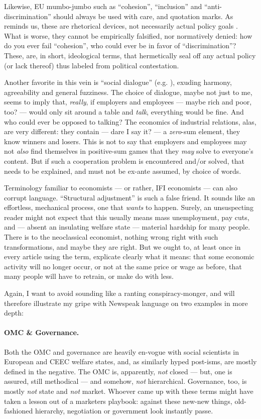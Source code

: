 \documentclass[11pt,a4paper,oneside]{article}
\begin{document}
Likewise, \gls{EU} mumbo-jumbo such as ``cohesion'', ``inclusion'' and ``anti-discrimination'' should always be used with care, and quotation marks.
As \citeauthor{Offe2003} reminds us, these are rhetorical devices, not necessarily actual policy goals \citeyearpar[461]{Offe2003}.
What is worse, they cannot be empirically falsified, nor normatively denied:
how do you ever fail ``cohesion'', who could ever be in favor of ``discrimination''?
These, are, in short, ideological terms, that hermetically seal off any actual policy (or lack thereof) thus labeled from political contestation.

Another favorite in this vein is ``social dialogue'' (e.g. \citealt{Durr2009}), exuding harmony, agreeability and general fuzziness.
The choice of dialogue, maybe not just to me, seems to imply that, \emph{really}, if employers and employees --- maybe rich and poor, too? --- would only sit around a table and \emph{talk}, everything would be fine.
And who could ever be opposed to talking?
The economics of industrial relations, alas, are very different:
they contain --- dare I say it? --- a \emph{zero}-sum element, they know winners and losers.
This is not to say that employers and employees may not \emph{also} find themselves in positive-sum games that they \emph{may} solve to everyone's content.
But if such a cooperation problem is encountered and/or solved, that needs to be explained, and must not be ex-ante assumed, by choice of words.

Terminology familiar to economists --- or rather, \gls{IFI} economists --- can also corrupt language.
``Structural adjustment'' \citep[e.g.][19]{Begg2008} is such a false friend.
It sounds like an effortless, mechanical process, one that \emph{wants} to happen.
Surely, an unsuspecting reader might not expect that this usually means mass unemployment, pay cuts, and --- absent an insulating welfare state --- material hardship for many people.
There is to the neoclassical economist, nothing wrong right with such transformations, and maybe they are right.
But we ought to, at least once in every article using the term, explicate clearly what it means:
that some economic activity will no longer occur, or not at the same price or wage as before, that many people will have to retrain, or make do with less.

Again, I want to avoid sounding like a ranting conspiracy-monger, and will therefore illustrate my gripe with Newspeak language on two examples in more depth:

\paragraph{\gls{OMC} \& Governance.} Both the \gls{OMC} and governance are heavily en-vogue with social scientists in European and \gls{CEEC} welfare states, and, as similarly hyped post-isms, are mostly defined in the negative.
The \gls{OMC} is, apparently, \emph{not} closed --- but, one is assured, still methodical --- and somehow, \emph{not} hierarchical.
Governance, too, is mostly \emph{not} state and \emph{not} market.
Whoever came up with these terms might have taken a lesson out of a marketers playbook:
against these new-new things, old-fashioned hierarchy, negotiation or government look instantly passe.
\end{document}
